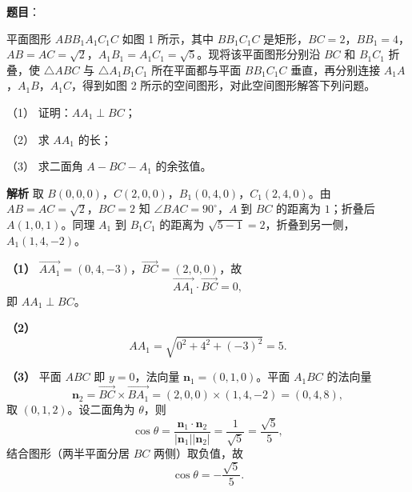 \begin{answer}

\textbf{题目}：

平面图形 $ABB_1A_1C_1C$ 如图 1 所示，其中 $BB_1C_1C$ 是矩形，$BC=2$，$BB_1=4$，$AB=AC=\sqrt2$，$A_1B_1=A_1C_1=\sqrt5$。现将该平面图形分别沿 $BC$ 和 $B_1C_1$ 折叠，使 $\triangle ABC$ 与 $\triangle A_1B_1C_1$ 所在平面都与平面 $BB_1C_1C$ 垂直，再分别连接 $A_1A$，$A_1B$，$A_1C$，得到如图 2 所示的空间图形，对此空间图形解答下列问题。

（1） 证明：$AA_1\perp BC$；

（2） 求 $AA_1$ 的长；

（3） 求二面角 $A-BC-A_1$ 的余弦值。
\nopagebreak[4]
\begin{center}\end{center}
\nopagebreak[4]
\textbf{解析}
取 $B(0,0,0)$，$C(2,0,0)$，$B_1(0,4,0)$，$C_1(2,4,0)$。由 $AB=AC=\sqrt2$，$BC=2$ 知 $\angle BAC=90^\circ$，$A$ 到 $BC$ 的距离为 $1$；折叠后 $A(1,0,1)$。同理 $A_1$ 到 $B_1C_1$ 的距离为 $\sqrt{5-1}=2$，折叠到另一侧，$A_1(1,4,-2)$。

\textbf{（1）} $\overrightarrow{AA_1}=(0,4,-3)$，$\overrightarrow{BC}=(2,0,0)$，故
\nopagebreak[4]
\[\overrightarrow{AA_1}\cdot\overrightarrow{BC}=0,\]
即 $AA_1\perp BC$。

\textbf{（2）}
\nopagebreak[4]
\[AA_1=\sqrt{0^2+4^2+(-3)^2}=5.\]

\textbf{（3）} 平面 $ABC$ 即 $y=0$，法向量 $\boldsymbol n_1=(0,1,0)$。平面 $A_1BC$ 的法向量
\nopagebreak[4]
\[\boldsymbol n_2=\overrightarrow{BC}\times\overrightarrow{BA_1}=(2,0,0)\times(1,4,-2)=(0,4,8),\]
取 $(0,1,2)$。设二面角为 $\theta$，则
\nopagebreak[4]
\[\cos\theta=\frac{\boldsymbol n_1\cdot\boldsymbol n_2}{|\boldsymbol n_1||\boldsymbol n_2|}=\frac1{\sqrt5}=\frac{\sqrt5}5,\]
结合图形（两半平面分居 $BC$ 两侧）取负值，故
\nopagebreak[4]
\[\cos\theta=-\frac{\sqrt5}5.\]




\end{answer}
